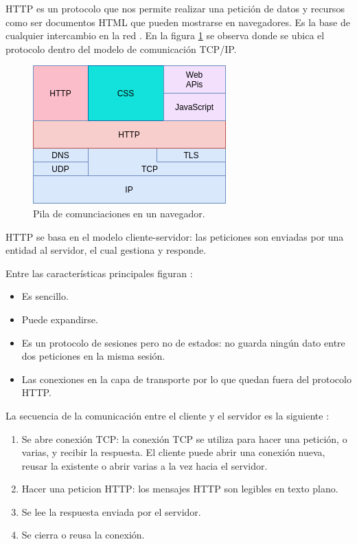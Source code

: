 HTTP es un protocolo que nos permite realizar una petición de datos y recursos como ser documentos HTML que pueden mostrarse en navegadores. Es la base de cualquier intercambio en la red \citep{WEBSITE:19}. En la figura \ref{fig:Protocolo HTTP } se observa donde se ubica el protocolo dentro del modelo de comunicación TCP/IP.


\begin{figure}[ht]
	\centering
	\includegraphics[scale=.5]{./Figures/http.png}
	\caption{Pila de comunciaciones en un navegador.}
	\label{fig:Protocolo HTTP }
\end{figure}

HTTP se basa en el modelo cliente-servidor: las peticiones son enviadas por una entidad al servidor, el cual gestiona y responde.

Entre las características principales figuran \citep{WEBSITE:19}:
\begin{itemize}
\item Es sencillo.
\item Puede expandirse.
\item Es un protocolo de sesiones pero no de estados: no guarda ningún dato entre dos peticiones en la misma sesión.
\item Las conexiones en la capa de transporte por lo que quedan fuera del protocolo HTTP.
\end{itemize}

La secuencia de la comunicación entre el cliente y el servidor es la siguiente \citep{WEBSITE:19}:
\begin{enumerate}
\item Se abre conexión TCP: la conexión TCP se utiliza para hacer una petición, o varias, y recibir la respuesta. El cliente puede abrir una conexión nueva, reusar la existente o abrir varias a la vez hacia el servidor.
\item Hacer una peticion HTTP: los mensajes HTTP son legibles en texto plano.
\item Se lee la respuesta enviada por el servidor.
\item Se cierra o reusa la conexión.
\end{enumerate}

